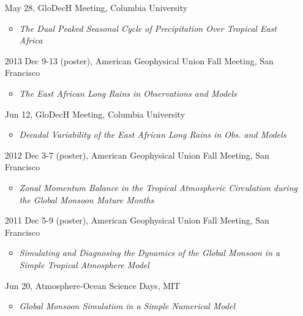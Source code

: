 \documentclass[11pt]{article}
\newcommand{\meetingName}[1]{#1}
\newcommand{\ptitle}[1]{\textit{#1}}
\begin{document}
\begin{itemize}[leftmargin=10ex, itemsep=1ex]
	\item[\phantom{2014}]May 28,  \meetingName{ GloDecH Meeting}, Columbia University
	\begin{itemize}[leftmargin=4ex]
		\item \ptitle{The Dual Peaked Seasonal Cycle of Precipitation Over Tropical East Africa}
		\end{itemize}

	\item[2013] Dec 9-13 (poster), \meetingName{American Geophysical Union Fall Meeting}, San Francisco
	\begin{itemize}[leftmargin=4ex]
		\item \ptitle{The East African Long Rains in Observations and Models}
		\end{itemize}

	\item [\phantom{2013}] Jun 12, \meetingName{GloDecH Meeting}, Columbia University
	\begin{itemize}[leftmargin=4ex]
		\item \ptitle{Decadal Variability of the East African Long Rains in Obs. and Models}
		\end{itemize}

	\item [2012] Dec 3-7 (poster), \meetingName{American Geophysical Union Fall Meeting}, San Francisco
	\begin{itemize}[leftmargin=4ex]
		\item \ptitle{Zonal Momentum Balance in the Tropical Atmospheric Circulation during the Global Monsoon Mature Months}
		\end{itemize}

	\item [2011] Dec 5-9 (poster), \meetingName{American Geophysical Union Fall Meeting}, San Francisco
	\begin{itemize}[leftmargin=4ex]
		\item \ptitle{Simulating and Diagnosing the Dynamics of the Global Monsoon in a Simple Tropical Atmosphere Model}
		\end{itemize}

	\item [\phantom{2011}] Jun 20, \meetingName{Atmosphere-Ocean Science Days}, MIT
	\begin{itemize}[leftmargin=4ex]
		\item \ptitle{Global Monsoon Simulation in a Simple Numerical Model}
		\end{itemize}


\end{itemize}
\end{document}
